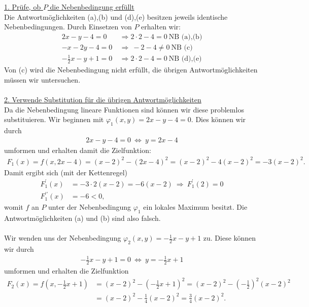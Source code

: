 \underline{1. Prüfe, ob $ P $ die Nebenbedingung erfüllt}\\
Die Antwortmöglichkeiten (a),(b) und (d),(e) besitzen jeweils identische Nebenbedingungen.
Durch Einsetzen von $ P $ erhalten wir:
\begin{align*}
	2 x - y -4 = 0 \ &\Rightarrow 2 \cdot 2 -4  = 0 \ \text{NB (a),(b)}\\
	-x  - 2y - 4 = 0 \ &\Rightarrow \ -2 -4 \neq 0 \ \text{NB (c)}\\
	-\frac{1}{2}x - y + 1 = 0 \ &\Rightarrow 2 \cdot 2 -4  = 0 \ \text{NB (d),(e)}
\end{align*}
Von (c) wird die Nebenbedingung nicht erfüllt, die übrigen Antwortmöglichkeiten müssen wir untersuchen.\\
\\
\underline{2. Verwende Substitution für die übrigen Antwortmöglichkeiten}\\
Da die Nebenbedingung lineare Funktionen sind können wir diese problemlos substituieren.
Wir beginnen mit $ \varphi_1(x,y) = 2x-y -4 = 0 $. Dies können wir durch
\begin{align*}
	2x -y -4 = 0 \ \Leftrightarrow \ y = 2x - 4
\end{align*}
umformen und erhalten damit die Zielfunktion:
\begin{align*}
	F_1(x) = f(x, 2x -4) = (x-2)^2 - (2x-4)^2
	= (x-2)^2 - 4 (x-2)^2
	= -3 (x-2)^2.
\end{align*}
Damit ergibt sich (mit der Kettenregel)
\begin{align*}
	F_1^\prime(x) &= -3 \cdot 2 (x -2 ) = -6 (x-2) \ \Rightarrow \ F_1^\prime(2) = 0\\
	F_1^{\prime \prime}(x) &= -6 < 0,
\end{align*}
womit $ f $ an $ P $ unter der Nebenbedingung $ \varphi_1 $ ein lokales Maximum besitzt. Die Antwortmöglichkeiten (a) und (b) sind also falsch.\\
\\
Wir wenden uns der Nebenbedingung $ \varphi_2(x,y) = - \frac{1}{2} x -y +1 $ zu. Diese können wir durch 
\begin{align*}
	- \frac{1}{2} x -y  +1 = 0 
	\ \Leftrightarrow \
	y = - \frac{1}{2}x +1
\end{align*}
umformen und erhalten die Zielfunktion
\begin{align*}
	F_2(x) = f\left(x,-\frac{1}{2} x +1\right)
	&=
	(x-2)^2 - \left(-\frac{1}{2} x +1\right)^2
	=
	(x-2)^2- \left(-\frac{1}{2}\right)^2 (x - 2)^2\\
	&=
	(x-2)^2 - \frac{1}{4}(x - 2)^2
	= \frac{3}{4} (x-2)^2.
\end{align*}
